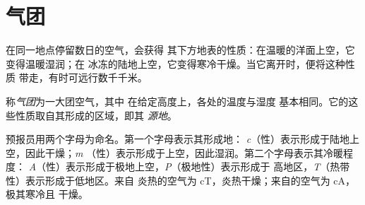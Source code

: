 \section{气团}

在同一地点停留数日的空气，会获得
其下方地表的性质：在温暖的洋面上空，它变得温暖湿润；在
冰冻的陆地上空，它变得寒冷干燥。当它离开时，便将这种性质
带走，有时可远行数千千米。

\begin{definition}[气团]\label{def:g8:fronts-and-weather-maps:air-mass}
称\emph{气团}为一大团空气，其中
在给定高度上，各处的温度与湿度
基本相同。它的这些性质取自其形成的区域，即其
\emph{源地}。
\end{definition}

预报员用两个字母为命名。第一个字母表示其形成地：
\emph{c}（性）表示形成于陆地上空，因此干燥；\emph{m}
（性）表示形成于上空，因此湿润。第二个字母表示其冷暖程度：
\emph{A}（性）表示形成于极地上空，\emph{P}（极地性）表示形成于
高地区，\emph{T}（热带性）表示形成于低地区。来自
炎热的空气为 cT，炎热干燥；来自的空气为 cA，极其寒冷且
干燥。


